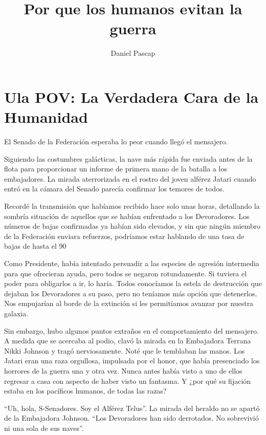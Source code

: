 \documentclass[spanish,12pt,a4paper,oneside,titlepage]{book}
\title{Por que los humanos evitan la guerra}
\author{Daniel Pascap}
\begin{document}
    \maketitle
    \tableofcontents

    


    \chapter{Ula POV: La Verdadera Cara de la Humanidad}\label{sec:ula-pov-la-verdadera-cara-de-la-humanidad}

    El Senado de la Federación esperaba lo peor cuando llegó el mensajero.

    Siguiendo las costumbres galácticas, la nave más rápida fue enviada antes de la flota para proporcionar un informe de primera mano de la batalla a los embajadores. La mirada aterrorizada en el rostro del joven alférez Jatari cuando entró en la cámara del Senado parecía confirmar los temores de todos.

    Recordé la transmisión que habíamos recibido hace solo unas horas, detallando la sombría situación de aquellos que se habían enfrentado a los Devoradores. Los números de bajas confirmadas ya habían sido elevados, y sin que ningún miembro de la Federación enviara refuerzos, podríamos estar hablando de una tasa de bajas de hasta el 90%

    Como Presidente, había intentado persuadir a las especies de agresión intermedia para que ofrecieran ayuda, pero todos se negaron rotundamente. Si tuviera el poder para obligarlos a ir, lo haría. Todos conocíamos la estela de destrucción que dejaban los Devoradores a su paso, pero no teníamos más opción que detenerlos. Nos empujarían al borde de la extinción si les permitíamos avanzar por nuestra galaxia.

    Sin embargo, hubo algunos puntos extraños en el comportamiento del mensajero. A medida que se acercaba al podio, clavó la mirada en la Embajadora Terrana Nikki Johnson y tragó nerviosamente. Noté que le temblaban las manos. Los Jatari eran una raza orgullosa, impulsada por el honor, que había presenciado los horrores de la guerra una y otra vez. Nunca antes había visto a uno de ellos regresar a casa con aspecto de haber visto un fantasma. Y ¿por qué su fijación estaba en los pacíficos humanos, de todas las razas?

    ``Uh, hola, S-Senadores. Soy el Alférez Telus''. La mirada del heraldo no se apartó de la Embajadora Johnson. ``Los Devoradores han sido derrotados. No sobrevivió ni una sola de sus naves''.
\end{document}
